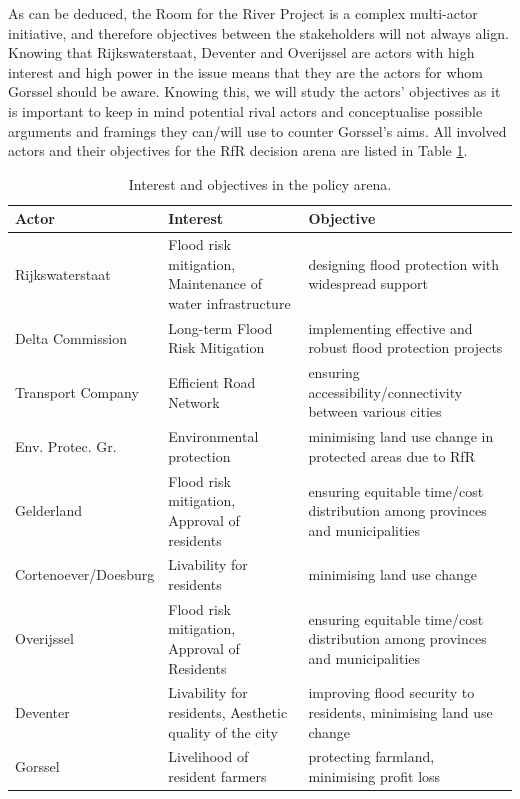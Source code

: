 \noindent As can be deduced, the Room for the River Project is a complex multi-actor initiative, and therefore objectives between the stakeholders will not always align. Knowing that Rijkswaterstaat, Deventer and Overijssel are actors with high interest and high power in the issue means that they are the actors for whom Gorssel should be aware. Knowing this, we will study the actors' objectives as it is important to keep in mind potential rival actors and conceptualise possible arguments and framings they can/will use to counter Gorssel's aims. All involved actors and their objectives for the RfR decision arena are listed in Table \ref{t:actortable}.

\begin{table}[h!]
\caption{Interest and objectives in the policy arena.}
\begin{tabular}{p{}p{}p{}}
\hline 
Actor & Interest & Objective \\ \hline
Rijkswaterstaat         & Flood risk mitigation, Maintenance of water infrastructure & designing flood protection with widespread support \\ 
Delta Commission        & Long-term Flood Risk Mitigation & implementing effective and robust flood protection projects \\
Transport Company       & Efficient Road Network & ensuring accessibility/connectivity between various cities \\
Env. Protec. Gr.        & Environmental protection & minimising land use change in protected areas due to RfR \\
Gelderland              & Flood risk mitigation, Approval of residents & ensuring equitable time/cost distribution among provinces and municipalities \\
Cortenoever/Doesburg    & Livability for residents & minimising land use change \\
Overijssel              & Flood risk mitigation, Approval of Residents & ensuring equitable time/cost distribution among provinces and municipalities \\
Deventer                & Livability for residents, Aesthetic quality of the city & improving flood security to residents, minimising land use change \\
Gorssel                & Livelihood of resident farmers & protecting farmland, minimising profit loss \\
\end{tabular}
\label{t:actortable}
\end{table}

